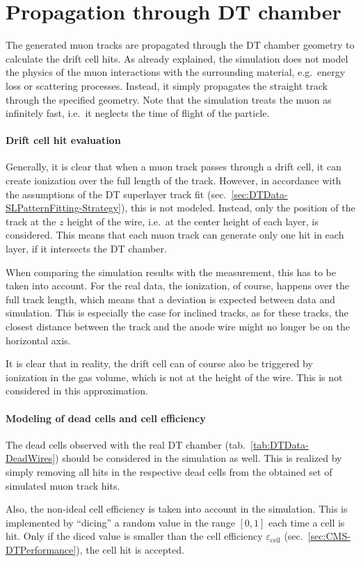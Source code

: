 \FloatBarrier
\section{Propagation through DT chamber}
\label{sec:Simulation-DT}

The generated muon tracks are propagated through the \ac{DT} chamber geometry to calculate the drift cell hits. As already explained, the simulation does not model the physics of the muon interactions with the surrounding material, e.g.\ energy loss or scattering processes. Instead, it simply propagates the straight track through the specified geometry. Note that the simulation treats the muon as infinitely fast, i.e.\ it neglects the time of flight of the particle.
\FloatBarrier
\paragraph{Drift cell hit evaluation}
Generally, it is clear that when a muon track passes through a drift cell, it can create ionization over the full length of the track. However, in accordance with the assumptions of the \ac{DT} superlayer track fit (sec.\ \ref{sec:DTData-SLPatternFitting-Strategy}), this is not modeled. Instead, only the position of the track at the $z$ height of the wire, i.e.\ at the center height of each layer, is considered. This means that each muon track can generate only one hit in each layer, if it intersects the \ac{DT} chamber.
\par When comparing the simulation results with the measurement, this has to be taken into account. For the real data, the ionization, of course, happens over the full track length, which means that a deviation is expected between data and simulation. This is especially the case for inclined tracks, as for these tracks, the closest distance between the track and the anode wire might no longer be on the horizontal axis.
\par It is clear that in reality, the drift cell can of course also be triggered by ionization in the gas volume, which is not at the height of the wire. This is not considered in this approximation.
\FloatBarrier
\paragraph{Modeling of dead cells and cell efficiency}
The dead cells observed with the real \ac{DT} chamber (tab.\ \ref{tab:DTData-DeadWires}) should be considered in the simulation as well. This is realized by simply removing all hits in the respective dead cells from the obtained set of simulated muon track hits.
\par Also, the non-ideal cell efficiency is taken into account in the simulation. This is implemented by \enquote{dicing} a random value in the range $[0,1]$ each time a cell is hit. Only if the diced value is smaller than the cell efficiency $\varepsilon_\text{cell}$ (sec.\ \ref{sec:CMS-DTPerformance}), the cell hit is accepted.
\FloatBarrier
